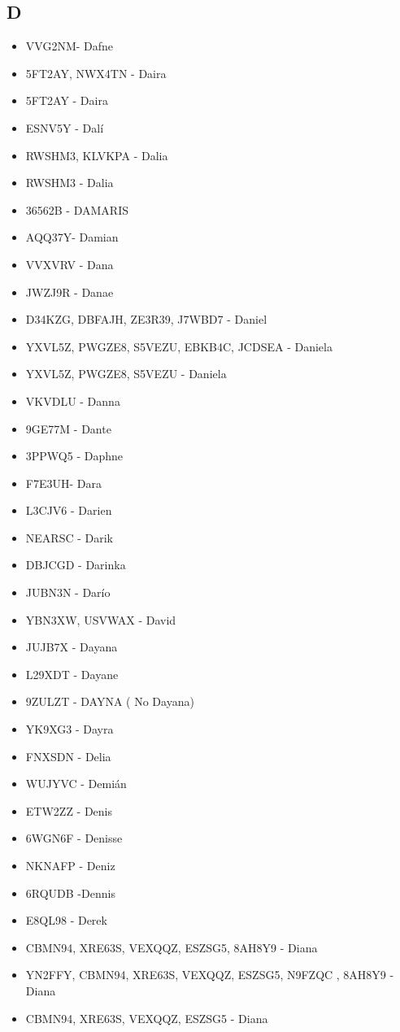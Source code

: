 \subsection*{D}
\begin{itemize}[leftmargin=*,nosep]
\item VVG2NM- Dafne
\item 5FT2AY, NWX4TN - Daira
\item 5FT2AY - Daira
\item ESNV5Y - Dalí
\item RWSHM3, KLVKPA - Dalia
\item RWSHM3 - Dalia
\item 36562B - DAMARIS
\item AQQ37Y- Damian
\item VVXVRV - Dana
\item JWZJ9R  - Danae
\item D34KZG, DBFAJH, ZE3R39, J7WBD7 - Daniel
\item YXVL5Z, PWGZE8, S5VEZU, EBKB4C, JCDSEA - Daniela
\item YXVL5Z, PWGZE8, S5VEZU - Daniela
\item VKVDLU - Danna
\item 9GE77M - Dante
\item 3PPWQ5 - Daphne
\item F7E3UH- Dara
\item L3CJV6 - Darien
\item NEARSC - Darik
\item DBJCGD - Darinka
\item JUBN3N - Darío
\item YBN3XW, USVWAX - David
\item JUJB7X - Dayana
\item L29XDT - Dayane
\item 9ZULZT - DAYNA ( No Dayana)
\item YK9XG3 - Dayra
\item FNXSDN - Delia
\item WUJYVC - Demián
\item ETW2ZZ - Denis
\item 6WGN6F - Denisse
\item NKNAFP - Deniz
\item 6RQUDB  -Dennis
\item E8QL98 - Derek
\item CBMN94, XRE63S, VEXQQZ, ESZSG5, 8AH8Y9 - Diana
\item YN2FFY, CBMN94, XRE63S, VEXQQZ, ESZSG5, N9FZQC , 8AH8Y9 - Diana
\item CBMN94, XRE63S, VEXQQZ, ESZSG5 - Diana

\end{itemize}
